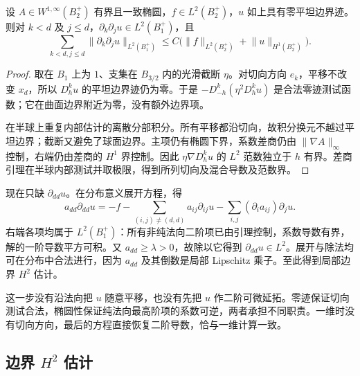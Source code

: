 \begin{lemma}[边界切向估计]
\label{b2:lem:16-tangential-estimate}
设 \(A\in W^{1,\infty}(B_2^+)\) 有界且一致椭圆，\(f\in L^2(B_2^+)\)，\(u\) 如上具有零平坦边界迹。则对 \(k<d\) 及 \(j\le d\)，\(\partial_k\partial_j u\in L^2(B_1^+)\)，且
\[\sum_{k<d,j\le d}\lVert\partial_k\partial_j u\rVert_{L^2(B_1^+)}
 \le C\bigl(\lVert f\rVert_{L^2(B_2^+)}+\lVert u\rVert_{H^1(B_2^+)}\bigr).\]
\end{lemma}
\begin{proof}
取在 \(B_1\) 上为 \(1\)、支集在 \(B_{3/2}\) 内的光滑截断 \(\eta\)。对切向方向 \(e_k\)，平移不改变 \(x_d\)，所以 \(D_h^ku\) 的平坦边界迹仍为零。于是 \(-D_{-h}^k(\eta^2D_h^ku)\) 是合法零迹测试函数；它在曲面边界附近为零，没有额外边界项。

在半球上重复内部估计的离散分部积分。所有平移都沿切向，故积分换元不越过平坦边界；截断又避免了球面边界。主项仍有椭圆下界，系数差商仍由 \(\lVert\nabla A\rVert_\infty\) 控制，右端仍由差商的 \(H^1\) 界控制。因此 \(\eta\nabla D_h^ku\) 的 \(L^2\) 范数独立于 \(h\) 有界。差商引理在半球内部测试并取极限，得到所列切向及混合导数及范数界。
\end{proof}

现在只缺 \(\partial_{dd}u\)。在分布意义展开方程，得
\[
 a_{dd}\partial_{dd}u
 =-f-\sum_{(i,j)\ne(d,d)}a_{ij}\partial_{ij}u
       -\sum_{i,j}(\partial_i a_{ij})\partial_j u.
\]
右端各项均属于 \(L^2(B_1^+)\)：所有非纯法向二阶项已由引理控制，系数导数有界，解的一阶导数平方可积。又 \(a_{dd}\ge\lambda>0\)，故除以它得到 \(\partial_{dd}u\in L^2\)。展开与除法均可在分布中合法进行，因为 \(a_{dd}\) 及其倒数是局部 Lipschitz 乘子。至此得到局部边界 \(H^2\) 估计。

\ProseParagraphBreak

这一步没有沿法向把 \(u\) 随意平移，也没有先把 \(u\) 作二阶可微延拓。零迹保证切向测试合法，椭圆性保证纯法向最高阶项的系数可逆，两者承担不同职责。一维时没有切向方向，最后的方程直接恢复二阶导数，恰与一维计算一致。

\subsection{边界 \texorpdfstring{\(H^2\)}{H2} 估计}
\label{b2:subsec:160303}


